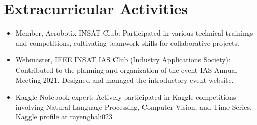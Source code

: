 \documentclass[letterpaper,11pt]{article}
\newcommand{\resumeItem}[1]{
  \item\small{
    {#1 \vspace{-2pt}}
  }
}
\newcommand{\resumeItemListStart}{\begin{itemize}}
\newcommand{\resumeItemListEnd}{\end{itemize}\vspace{-4pt}}
\begin{document}
\fi



\vspace{1pt}

\section{Extracurricular Activities}
    \resumeItemListStart
        \resumeItem{Member, Aerobotix INSAT Club: Participated in various technical trainings and competitions, cultivating teamwork skills for collaborative projects.}
        \resumeItem{Webmaster, IEEE INSAT IAS Club (Industry Applications Society): Contributed to the planning and organization of the event IAS Annual Meeting 2021. Designed and managed the introductory event website.}
        \resumeItem{Kaggle Notebook expert: Actively participated in Kaggle competitions involving Natural Language Processing, Computer Vision, and Time Series. Kaggle profile at \href{https://www.kaggle.com/rayenghali023}{\raisebox{-0.2\height} {\faKaggle \underline{ rayenghali023}}} } \resumeItemListEnd




\vspace{1pt}
    
\end{document}
